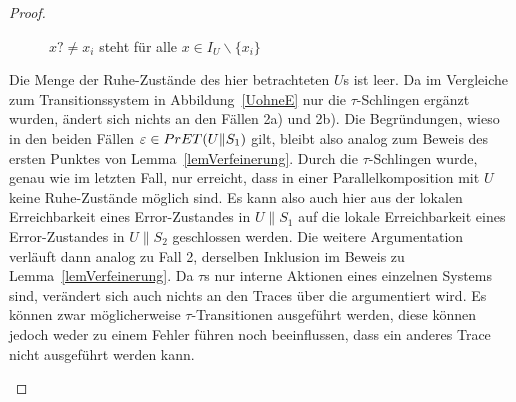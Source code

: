 \begin{proof}
\begin{itemize}
\begin{figure} [h!tbp]
\begin{center}
        \caption{$x?\neq x_i$ steht für alle $x\in I_U\backslash\{x_i\}$}
\label{UohneEmitTau}
      \end{center}
      \end{figure}
      Die Menge der Ruhe-Zustände des hier betrachteten $U$s ist leer. Da im
      Vergleiche zum Transitionssystem in Abbildung~\ref{UohneE} nur die
      $\tau$-Schlingen ergänzt wurden, ändert sich nichts an den Fällen 2a) und
      2b). Die Begründungen, wieso in den beiden Fällen $\varepsilon\in
      PrET{}(U\|S_1)$ gilt, bleibt also analog zum Beweis  des ersten Punktes von
      Lemma~\ref{lemVerfeinerung}. Durch die $\tau$-Schlingen wurde, genau wie
      im letzten Fall, nur erreicht, dass in einer Parallelkomposition mit $U$
      keine Ruhe-Zustände möglich sind. Es kann also auch hier aus der lokalen
      Erreichbarkeit eines Error-Zustandes in $U\|S_1$ auf die lokale
      Erreichbarkeit eines Error-Zustandes in $U\|S_2$ geschlossen werden. Die weitere
      Argumentation verläuft dann analog zu Fall 2, derselben Inklusion im
      Beweis zu Lemma~\ref{lemVerfeinerung}. Da $\tau$s nur interne Aktionen
      eines einzelnen Systems sind, verändert sich auch nichts an den Traces
      über die argumentiert wird. Es können zwar möglicherweise
      $\tau$-Transitionen ausgeführt werden, diese können jedoch weder zu einem
      Fehler führen noch beeinflussen, dass ein anderes Trace nicht ausgeführt
      werden kann.
  \end{itemize}


\end{proof}
